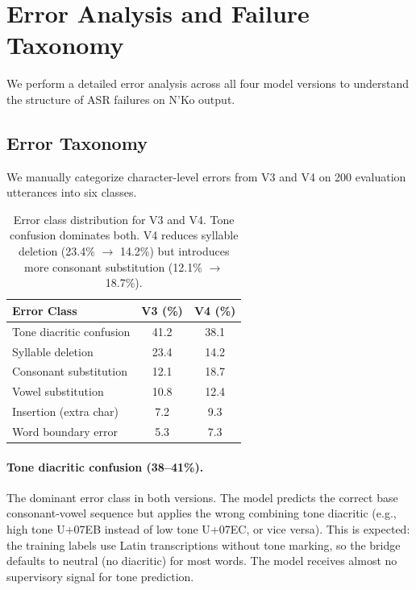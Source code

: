 \documentclass[11pt]{article}
\begin{document}
\section{Error Analysis and Failure Taxonomy}

We perform a detailed error analysis across all four model versions to understand the structure of ASR failures on N'Ko output.

\subsection{Error Taxonomy}

We manually categorize character-level errors from V3 and V4 on 200 evaluation utterances into six classes.

\begin{table}[t]
\centering
\small
\begin{tabular}{lcc}
\toprule
\textbf{Error Class} & \textbf{V3 (\%)} & \textbf{V4 (\%)} \\
\midrule
Tone diacritic confusion & 41.2 & 38.1 \\
Syllable deletion & 23.4 & 14.2 \\
Consonant substitution & 12.1 & 18.7 \\
Vowel substitution & 10.8 & 12.4 \\
Insertion (extra char) & 7.2 & 9.3 \\
Word boundary error & 5.3 & 7.3 \\
\bottomrule
\end{tabular}
\caption{Error class distribution for V3 and V4. Tone confusion dominates both. V4 reduces syllable deletion (23.4\% $\to$ 14.2\%) but introduces more consonant substitution (12.1\% $\to$ 18.7\%).}
\label{tab:error-taxonomy}
\end{table}

\paragraph{Tone diacritic confusion (38--41\%).}
The dominant error class in both versions.
The model predicts the correct base consonant-vowel sequence but applies the wrong combining tone diacritic (e.g., high tone U+07EB instead of low tone U+07EC, or vice versa).
This is expected: the training labels use Latin transcriptions without tone marking, so the bridge defaults to neutral (no diacritic) for most words.
The model receives almost no supervisory signal for tone prediction.
\end{document}
